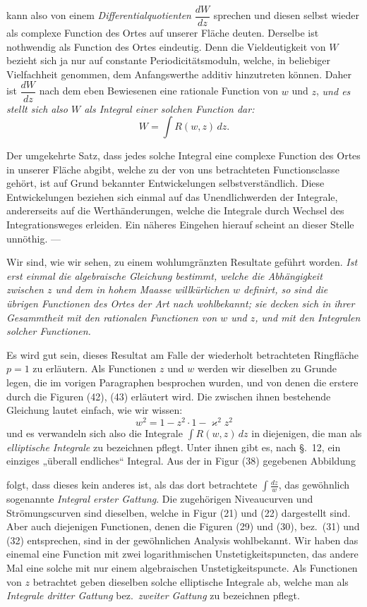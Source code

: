 \documentclass{article}
\begin{document}
kann also von einem \emph{Differentialquotienten} $\dfrac{dW}{dz}$ sprechen und diesen selbst wieder als complexe Function des Ortes auf unserer Fläche deuten. Derselbe ist nothwendig als Function des Ortes eindeutig. Denn die Vieldeutigkeit von $W$ bezieht sich ja nur auf constante Periodicitätsmoduln, welche, in beliebiger Vielfachheit genommen, dem Anfangswerthe additiv hinzutreten können. Daher ist $\dfrac{dW}{dz}$ nach dem eben Bewiesenen eine rationale Function von $w$ und $z$, \emph{und es stellt sich also $W$ als Integral einer solchen Function dar:}
\[ W = \int R(w, z)\,dz. \]

Der umgekehrte Satz, dass jedes solche Integral eine complexe Function des Ortes in unserer Fläche abgibt, welche zu der von uns betrachteten Functionsclasse gehört, ist auf Grund bekannter Entwickelungen selbstverständlich. Diese Entwickelungen beziehen sich einmal auf das Unendlichwerden der Integrale, andererseits auf die Werthänderungen, welche die Integrale durch Wechsel des Integrationsweges erleiden. Ein näheres Eingehen hierauf scheint an dieser Stelle unnöthig. ---

Wir sind, wie wir sehen, zu einem wohlumgränzten Resultate geführt worden. \emph{Ist erst einmal die algebraische Gleichung bestimmt, welche die Abhängigkeit zwischen $z$ und dem in hohem Maasse willkürlichen $w$ definirt, so sind die übrigen Functionen des Ortes der Art nach wohlbekannt; sie decken sich in ihrer Gesammtheit mit den rationalen Functionen von $w$ und $z$, und mit den Integralen solcher Functionen.}

Es wird gut sein, dieses Resultat am Falle der wiederholt betrachteten Ringfläche $p = 1$ zu erläutern. Als Functionen $z$ und $w$ werden wir dieselben zu Grunde legen, die im vorigen Paragraphen besprochen wurden, und von denen die erstere durch die Figuren (42), (43) erläutert wird. Die zwischen ihnen bestehende Gleichung lautet einfach, wie wir wissen:
\[ w^{2} = 1 - z^{2} \cdot 1 - \varkappa^{2} z^{2} \]
und es verwandeln sich also die Integrale $\displaystyle\int R(w, z)\,dz$ in diejenigen, die man als \emph{elliptische Integrale} zu bezeichnen pflegt. Unter ihnen gibt es, nach §.~12, ein einziges „überall endliches“ Integral. Aus der in Figur (38) gegebenen Abbildung

folgt, dass dieses kein anderes ist, als das dort betrachtete $\displaystyle\int \frac{dz}{w}$, das gewöhnlich sogenannte \emph{Integral erster Gattung}. Die zugehörigen Niveaucurven und Strömungscurven sind dieselben, welche in Figur (21) und (22) dargestellt sind. Aber auch diejenigen Functionen, denen die Figuren (29) und (30), bez.\ (31) und (32) entsprechen, sind in der gewöhnlichen Analysis wohlbekannt. Wir haben das einemal eine Function mit zwei logarithmischen Unstetigkeitspuncten, das andere Mal eine solche mit nur einem algebraischen Unstetigkeitspuncte. Als Functionen von $z$ betrachtet geben dieselben solche elliptische Integrale ab, welche man als \emph{Integrale dritter Gattung} bez.\ \emph{zweiter Gattung} zu bezeichnen pflegt.
\end{document}
